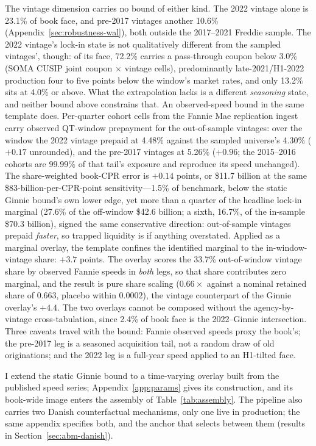 The vintage dimension carries no bound of either kind. The 2022 vintage alone is 23.1\% of book face, and pre-2017 vintages another 10.6\% (Appendix~\ref{sec:robustness-wal}), both outside the 2017--2021 Freddie sample. The 2022 vintage's lock-in state is not qualitatively different from the sampled vintages', though: of its face, 72.2\% carries a pass-through coupon below 3.0\% (SOMA CUSIP joint coupon $\times$ vintage cells), predominantly late-2021/H1-2022 production four to five points below the window's market rates, and only 13.2\% sits at 4.0\% or above. What the extrapolation lacks is a different \emph{seasoning} state, and neither bound above constrains that. An observed-speed bound in the same template does. Per-quarter cohort cells from the Fannie Mae replication ingest carry observed QT-window prepayment for the out-of-sample vintages: over the window the 2022 vintage prepaid at 4.48\% against the sampled universe's 4.30\% ($+0.17$ unrounded), and the pre-2017 vintages at 5.26\% ($+0.96$; the 2015--2016 cohorts are 99.99\% of that tail's exposure and reproduce its speed unchanged). The share-weighted book-CPR error is $+0.14$ points, or \$11.7 billion at the same \$83-billion-per-CPR-point sensitivity---1.5\% of benchmark, below the static Ginnie bound's own lower edge, yet more than a quarter of the headline lock-in marginal (27.6\% of the off-window \$42.6 billion; a sixth, 16.7\%, of the in-sample \$70.3 billion), signed the same conservative direction: out-of-sample vintages prepaid \emph{faster}, so trapped liquidity is if anything overstated. Applied as a marginal overlay, the template confines the identified marginal to the in-window-vintage share: $+3.7$ points. The overlay scores the 33.7\% out-of-window vintage share by observed Fannie speeds in \emph{both} legs, so that share contributes zero marginal, and the result is pure share scaling ($0.66\times$ against a nominal retained share of $0.663$, placebo within $0.0002$), the vintage counterpart of the Ginnie overlay's $+4.4$. The two overlays cannot be composed without the agency-by-vintage cross-tabulation, since 2.4\% of book face is the 2022--Ginnie intersection. Three caveats travel with the bound: Fannie observed speeds proxy the book's; the pre-2017 leg is a seasoned acquisition tail, not a random draw of old originations; and the 2022 leg is a full-year speed applied to an H1-tilted face.

I extend the static Ginnie bound to a time-varying overlay built from the published speed series; Appendix~\ref{app:params} gives its construction, and its book-wide image enters the assembly of Table~\ref{tab:assembly}. The pipeline also carries two Danish counterfactual mechanisms, only one live in production; the same appendix specifies both, and the anchor that selects between them (results in Section~\ref{sec:abm-danish}).

